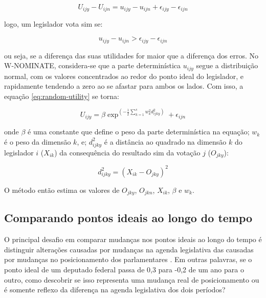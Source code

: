 \documentclass[a4paper,titlepage]{ppgi}\usepackage[]{graphicx}\usepackage[]{color}
\begin{document}
\begin{equation}
U_{ijy} - U_{ijn} = u_{ijy} - u_{ijn} + \epsilon_{ijy} - \epsilon_{ijn}
\end{equation}

logo, um legislador vota sim se:

\begin{equation}
u_{ijy} - u_{ijn} > \epsilon_{ijy} - \epsilon_{ijn}
\end{equation}

ou seja, se a diferença das suas utilidades for maior que a diferença dos
erros. No W-NOMINATE, considera-se que a parte determinística $u_{ijy}$ segue a
distribuição normal, com os valores concentrados ao redor do ponto ideal do
legislador, e rapidamente tendendo a zero ao se afastar para ambos os lados.
Com isso, a equação \ref{eq:random-utility} se torna:

\begin{equation}
  U_{ijy} = \beta \exp^{\left( - \frac{1}{2} \sum\limits_{k=1}^s w_k^2 d_{ijky}^2 \right)} + \epsilon_{ijn}
\end{equation}

onde $\beta$ é uma constante que define o peso da parte determinística na
equação; $w_k$ é o peso da dimensão $k$, e; $d_{ijky}^2$ é a distância ao
quadrado na dimensão $k$ do legislador $i$ ($X_{ik}$) da consequência do
resultado sim da votação $j$ ($O_{jky}$):

\begin{equation}
d_{ijky}^2 = \left(X_{ik} - O_{jky}\right)^2
\end{equation}

O método então estima os valores de $O_{jky}$, $O_{jkn}$, $X_{ik}$, $\beta$ e
$w_k$.


\subsection{Comparando pontos ideais ao longo do tempo}
\label{cap:fundamentacao:comparando-pontos-ideais-no-tempo}

O principal desafio em comparar mudanças nos pontos ideais ao longo do tempo é
distinguir alterações causadas por mudanças na agenda legislativa das causadas
por mudanças no posicionamento dos parlamentares \cite{Bailey2007}. Em outras
palavras, se o ponto ideal de um deputado federal passa de 0,3 para -0,2 de um ano
para o outro, como descobrir se isso representa uma mudança real de
posicionamento ou é somente reflexo da diferença na agenda legislativa dos dois
períodos?
\end{document}
